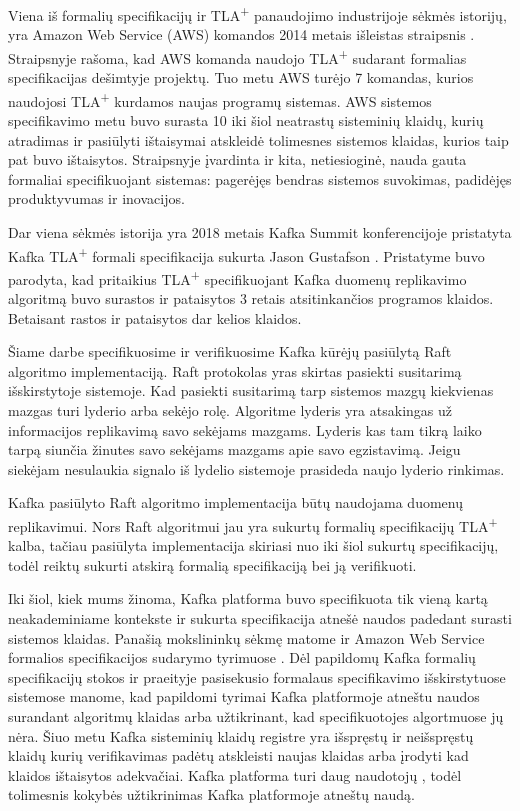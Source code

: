 \documentclass{VUMIFPSmagistrinis}
\begin{document}
		Viena iš formalių specifikacijų ir TLA\textsuperscript{+} panaudojimo industrijoje sėkmės istorijų, yra Amazon Web Service (AWS) komandos 2014 metais išleistas straipsnis \cite{newcombe2014use}.
		Straipsnyje rašoma,  kad AWS komanda naudojo TLA\textsuperscript{+} sudarant formalias specifikacijas dešimtyje projektų. Tuo metu AWS turėjo 7 komandas, kurios naudojosi TLA\textsuperscript{+} kurdamos naujas programų sistemas.
		AWS sistemos specifikavimo metu buvo surasta 10 iki šiol neatrastų sisteminių klaidų, kurių atradimas ir pasiūlyti ištaisymai atskleidė tolimesnes sistemos klaidas, kurios taip pat buvo ištaisytos.
		Straipsnyje įvardinta ir kita, netiesioginė, nauda gauta formaliai specifikuojant sistemas: pagerėjęs bendras sistemos suvokimas, padidėjęs produktyvumas ir inovacijos.
		

		Dar viena sėkmės istorija yra 2018 metais Kafka Summit konferencijoje pristatyta Kafka TLA\textsuperscript{+} formali specifikacija sukurta Jason Gustafson \cite{kfkTla}.
		Pristatyme buvo parodyta, kad pritaikius TLA\textsuperscript{+} specifikuojant Kafka duomenų replikavimo algoritmą buvo surastos ir pataisytos 3 retais atsitinkančios programos klaidos.
		Betaisant rastos ir pataisytos dar kelios klaidos.


		Šiame darbe specifikuosime ir verifikuosime Kafka kūrėjų pasiūlytą Raft algoritmo implementaciją.
		Raft protokolas yras skirtas pasiekti susitarimą išskirstytoje sistemoje.
		Kad pasiekti susitarimą tarp sistemos mazgų kiekvienas mazgas turi lyderio arba sekėjo rolę.
		Algoritme lyderis yra atsakingas už informacijos replikavimą savo sekėjams mazgams.
		Lyderis kas tam tikrą laiko tarpą siunčia žinutes savo sekėjams mazgams apie savo egzistavimą.
		Jeigu siekėjam nesulaukia signalo iš lydelio sistemoje prasideda naujo lyderio rinkimas.
		
		
		Kafka pasiūlyto Raft algoritmo implementacija būtų naudojama duomenų replikavimui.
		Nors Raft algoritmui jau yra sukurtų formalių specifikacijų TLA\textsuperscript{+} kalba, tačiau pasiūlyta implementacija skiriasi nuo iki šiol sukurtų specifikacijų, todėl reiktų sukurti atskirą formalią specifikaciją bei ją verifikuoti.


		Iki šiol, kiek mums žinoma, Kafka platforma buvo specifikuota tik vieną kartą \cite{kfkTla} neakademiniame kontekste ir sukurta specifikacija atnešė naudos padedant surasti sistemos klaidas.
		Panašią mokslininkų sėkmę matome ir Amazon Web Service formalios specifikacijos sudarymo tyrimuose \cite{newcombe2014use}.
		Dėl papildomų Kafka formalių specifikacijų stokos ir praeityje pasisekusio formalaus specifikavimo išskirstytuose sistemose manome, kad papildomi tyrimai Kafka platformoje atneštu naudos surandant algoritmų klaidas arba užtikrinant, kad specifikuotojes algortmuose jų nėra.
		Šiuo metu Kafka sisteminių klaidų registre \cite{kfkissue} yra išspręstų ir neišspręstų  klaidų kurių verifikavimas padėtų atskleisti naujas klaidas arba įrodyti kad klaidos ištaisytos adekvačiai.
		Kafka platforma turi daug naudotojų \cite{kfk}, todėl tolimesnis kokybės užtikrinimas Kafka platformoje atneštų naudą.
\end{document}
